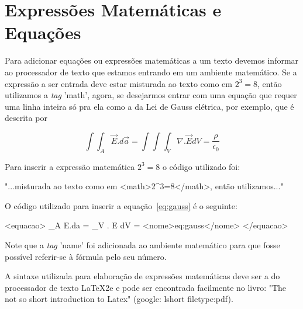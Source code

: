\newpage \chapter{Expressões Matemáticas e Equações}\setcounter{SteP}{1}
\label{sec:equacao}

Para adicionar equações ou expressões matemáticas a um texto devemos informar
ao processador de texto que estamos entrando em um ambiente matemático. Se a
expressão a ser entrada deve estar misturada ao texto como em
$2^3=8$, então utilizamos a {\it tag} 'math', agora, se desejarmos
entrar com uma equação que requer uma linha inteira só pra ela como a da Lei de
Gauss elétrica, por exemplo, que é descrita por

\begin{equation}
\int\int_A \vec E.d\vec a = \int \int \int_V \nabla . \vec E dV = \frac{\rho}{\epsilon_0}
\label{eq:gauss}
\end{equation}

Para inserir a expressão matemática $2^3=8$ o código utilizado foi:

\begin{BoxVerbatim}
"...misturada ao texto como em <math>2^3=8</math>, então utilizamos..."
\end{BoxVerbatim}

O código utilizado para inserir a equação~\ref{eq:gauss} é o seguinte:

\begin{BoxVerbatim}
<equacao>
\int\int_A \vec E.d\vec a = \int \int \int_V \nabla . \vec E dV 
= 
<nome>eq:gauss</nome>
</equacao>
\end{BoxVerbatim}

Note que a {\it tag} 'name' foi adicionada ao ambiente matemático para que
fosse possível referir-se à fórmula pelo seu número.

A sintaxe utilizada para elaboração de expressões matemáticas deve ser a do
processador de texto \LaTeX2e e pode ser encontrada facilmente no livro:
"The not so short introduction to Latex" (google: lshort filetype:pdf).
